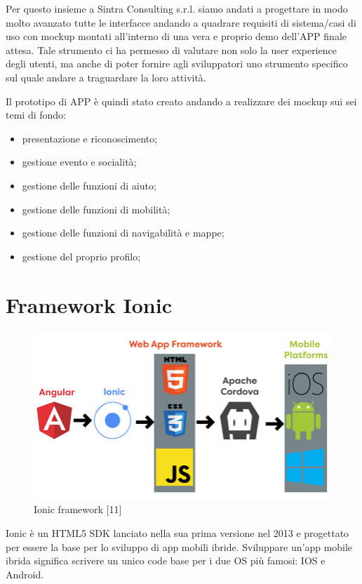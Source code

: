 Per questo insieme a Sintra Consulting s.r.l. siamo andati a progettare in modo molto avanzato tutte le interfacce andando a quadrare requisiti di sistema/casi di uso con mockup montati all’interno di una vera e proprio demo dell’APP finale attesa.
Tale strumento ci ha permesso di valutare non solo la user experience degli utenti, ma anche di poter fornire agli sviluppatori uno strumento specifico sul quale andare a traguardare la loro attività.

Il prototipo di APP è quindi stato creato andando a realizzare dei mockup sui sei temi di fondo:
\begin{itemize}
\item presentazione e riconoscimento;
\item gestione evento e socialità;
\item gestione delle funzioni di aiuto;
\item gestione delle funzioni di mobilità;
\item gestione delle funzioni di navigabilità e mappe;
\item gestione del proprio profilo;
\end{itemize}

\section{Framework Ionic}
\begin{figure}[h!]
    \centering  
    \caption{Ionic framework [11]}
    \includegraphics[scale=0.4]{img/cap2/angular-ionic}
\end{figure}

Ionic è un HTML5 SDK lanciato nella sua prima versione nel 2013 e progettato per essere la base per lo sviluppo di app mobili ibride. 
Sviluppare un'app mobile ibrida significa scrivere un unico code base per i due OS più famosi: IOS e Android.

